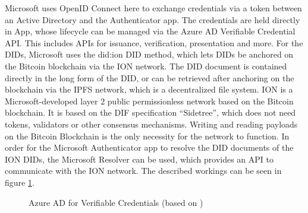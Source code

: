     Microsoft uses OpenID Connect here to exchange credentials via a token between an Active Directory and the Authenticator app. The credentials are held directly in App, whose lifecycle can be managed via the Azure AD Verifiable Credential API. This includes APIs for issuance, verification, presentation and more. For the \acp{DID}, Microsoft uses the did:ion \ac{DID} method, which lets \acp{DID} be anchored on the Bitcoin blockchain via the ION network. The \ac{DID} document is contained directly in the long form of the \ac{DID}, or can be retrieved after anchoring on the blockchain via the IPFS network, which is a decentralized file system. ION is a Microsoft-developed layer 2 public permissionless network based on the Bitcoin blockchain. It is based on the DIF specification “Sidetree”, which does not need tokens, validators or other consensus mechanisms. Writing and reading payloads on the Bitcoin Blockchain is the only necessity for the network to function. In order for the Microsoft Authenticator app to resolve the \ac{DID} documents of the ION \acp{DID}, the Microsoft Resolver can be used, which provides an API to communicate with the ION network. The described workings can be seen in figure \ref{figure: azure ad}. \cite{neira_introduction_2021}
    
    \begin{figure}[ht]
	    \centering    	   
	    \makebox[\textwidth]{}
        \caption{Azure AD for Verifiable Credentials (based on \cite{neira_introduction_2021})}
        \label{figure: azure ad}
    \end{figure}
    
